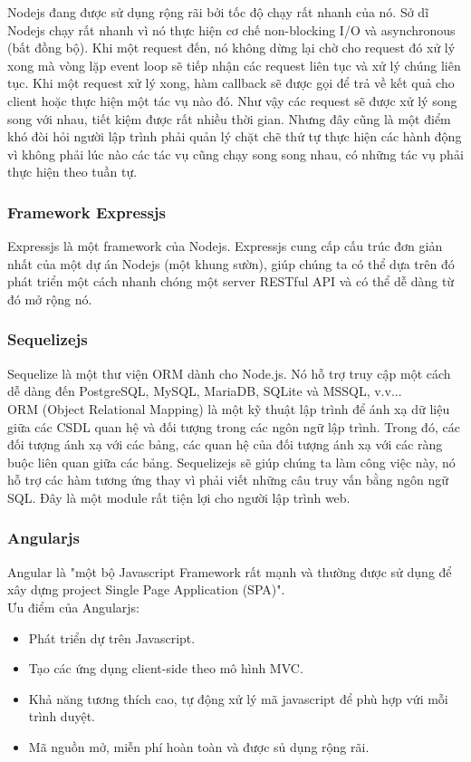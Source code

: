 \documentclass[a4paper,12pt,oneside]{article}
\begin{document}
\noindent Nodejs đang được sử dụng rộng rãi bởi tốc độ chạy rất nhanh của nó. Sở dĩ Nodejs chạy rất nhanh vì nó thực hiện cơ chế non-blocking I/O và asynchronous (bất đồng bộ). Khi một request đến, nó không dừng lại chờ cho request đó xử lý xong mà vòng lặp event loop sẽ tiếp nhận các request liên tục và xử lý chúng liên tục. Khi một request xử lý xong, hàm callback sẽ được gọi để trả về kết quả cho client hoặc thực hiện một tác vụ nào đó. Như vậy các request sẽ được xử lý song song với nhau, tiết kiệm được rất nhiều thời gian. Nhưng đây cũng là một điểm khó đòi hỏi người lập trình phải quản lý chặt chẽ thứ tự thực hiện các hành động vì không phải lúc nào các tác vụ cũng chạy song song nhau, có những tác vụ phải thực hiện theo tuần tự.

\subsubsection{Framework Expressjs}
\noindent Expressjs là một framework của Nodejs. Expressjs cung cấp cấu trúc đơn giản nhất của một dự án Nodejs (một khung sườn), giúp chúng ta có thể dựa trên đó phát triển một cách nhanh chóng một server RESTful API và có thể dễ dàng từ đó mở rộng nó.

\subsubsection{Sequelizejs}
\noindent Sequelize là một thư viện ORM dành cho Node.js. Nó hỗ trợ truy cập một cách dễ dàng đến PostgreSQL, MySQL, MariaDB, SQLite và MSSQL, v.v...\\
 ORM (Object Relational Mapping) là một kỹ thuật lập trình để ánh xạ dữ liệu giữa các CSDL quan hệ và đối tượng trong các ngôn ngữ lập trình. Trong đó, các đối tượng ánh xạ với các bảng, các quan hệ của đối tượng ánh xạ với các ràng buộc liên quan giữa các bảng. Sequelizejs sẽ giúp chúng ta làm công việc này, nó hỗ trợ các hàm tương ứng thay vì phải viết những câu truy vấn bằng ngôn ngữ SQL. Đây là một module rất tiện lợi cho người lập trình web.
 
\subsubsection{Angularjs}
\noindent Angular là "một bộ Javascript Framework rất mạnh và thường được sử dụng để xây dựng project Single Page Application (SPA)"\cite{angular}.\\
Ưu điểm của Angularjs:
\begin{itemize}
	\item Phát triển dự trên Javascript.
	\item Tạo các ứng dụng client-side theo mô hình MVC.
	\item Khả năng tương thích cao, tự động xử lý mã javascript để phù hợp vứi mỗi trình duyệt.
	\item Mã nguồn mở, miễn phí hoàn toàn và được sủ dụng rộng rãi.
\end{itemize}
\end{document}
